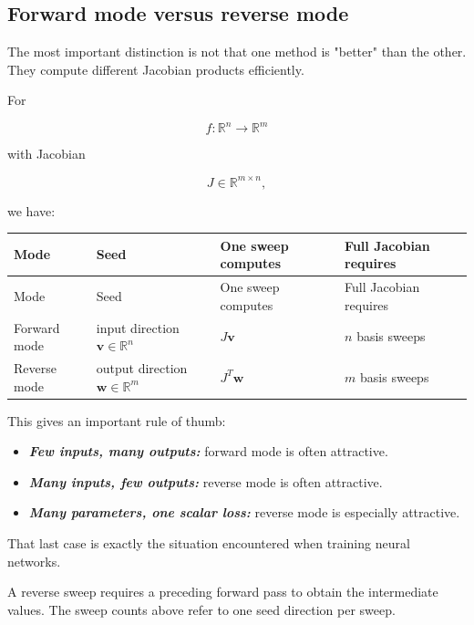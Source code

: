 \documentclass[10pt]{article}
\begin{document}
\begingroup\color{red}
\subsection*{Forward mode versus reverse mode}
The most important distinction is not that one method is "better" than the other. They compute different Jacobian products efficiently.

For

\[
f:\mathbb R^n\to\mathbb R^m
\]

with Jacobian

\[
J\in\mathbb R^{m\times n},
\]

we have:

\begingroup
\small
\setlength{\tabcolsep}{4pt}
\begin{longtable}{p{}p{}p{}p{}}
\hline
Mode & Seed & One sweep computes & Full Jacobian requires \\
\hline
\endfirsthead
Mode & Seed & One sweep computes & Full Jacobian requires \\
\hline
\endhead
Forward mode & input direction $\mathbf v\in\mathbb R^n$ & $J\mathbf v$ & $n$ basis sweeps \\[1.5pt]
Reverse mode & output direction $\mathbf w\in\mathbb R^m$ & $J^T\mathbf w$ & $m$ basis sweeps \\[1.5pt]
\hline
\end{longtable}
\endgroup
This gives an important rule of thumb:

\begin{itemize}
\item
\textbf{\textit{Few inputs, many outputs:}} forward mode is often attractive.

\item
\textbf{\textit{Many inputs, few outputs:}} reverse mode is often attractive.

\item
\textbf{\textit{Many parameters, one scalar loss:}} reverse mode is especially attractive.

\end{itemize}
That last case is exactly the situation encountered when training neural networks.

A reverse sweep requires a preceding forward pass to obtain the intermediate values. The sweep counts above refer to one seed direction per sweep.
\par\endgroup
\end{document}
